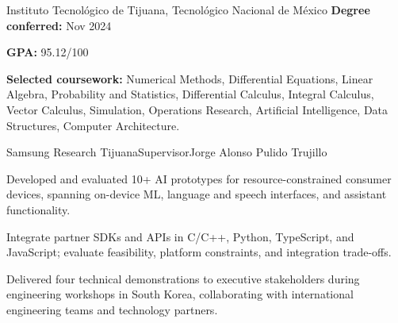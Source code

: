 \documentclass[10pt,letterpaper]{article}
\begin{document}


  {Instituto Tecnol\'ogico de Tijuana, Tecnol\'ogico Nacional de M\'exico}{}{}
\textbf{Degree conferred:} Nov 2024\par
\textbf{GPA:} 95.12/100\par
\textbf{Selected coursework:} Numerical Methods, Differential Equations, Linear Algebra, Probability and Statistics, Differential Calculus, Integral Calculus, Vector Calculus, Simulation, Operations Research, Artificial Intelligence, Data Structures, Computer Architecture.\par

  {Samsung Research Tijuana}{Supervisor}{Jorge Alonso Pulido Trujillo}
\begin{cvitems}
  \item Developed and evaluated 10+ AI prototypes for resource-constrained consumer devices, spanning on-device ML, language and speech interfaces, and assistant functionality.
  \item Integrate partner SDKs and APIs in C/C++, Python, TypeScript, and JavaScript; evaluate feasibility, platform constraints, and integration trade-offs.
  \item Delivered four technical demonstrations to executive stakeholders during engineering workshops in South Korea, collaborating with international engineering teams and technology partners.
\end{cvitems}
\end{document}
